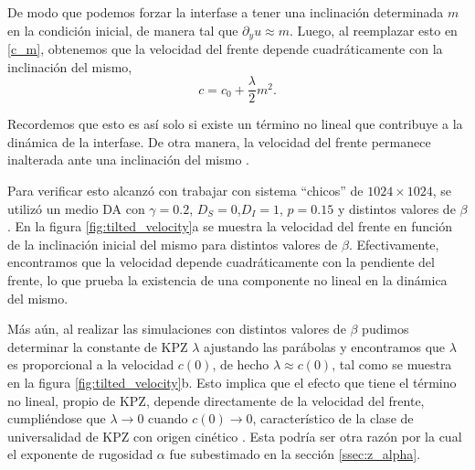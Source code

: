 De modo que podemos forzar la interfase a tener una inclinación determinada $m$ en la condición inicial, de manera tal que $\partial_y u \approx m$. Luego, al reemplazar esto en \ref{c_m}, obtenemos que la velocidad del frente depende cuadráticamente con la inclinación del mismo,
\begin{equation}
    c = c_0 + \frac{\lambda}{2} m^2.
\end{equation}

Recordemos que esto es así solo si existe un término no lineal que contribuye a la dinámica de la interfase. De otra manera, la velocidad del frente permanece inalterada ante una inclinación del mismo \cite{krug1990mechanism}.

Para verificar esto alcanzó con trabajar con sistema ``chicos'' de $1024\times1024$, se utilizó un medio DA con $\gamma = 0.2$, $D_S = 0$,$D_I=1$, $p=0.15$ y distintos valores de $\beta$. En la figura \ref{fig:tilted_velocity}a se muestra la velocidad del frente en función de la inclinación inicial del mismo para distintos valores de $\beta$. Efectivamente, encontramos que la velocidad depende cuadráticamente con la pendiente del frente, lo que prueba la existencia de una componente no lineal en la dinámica del mismo.

Más aún, al realizar las simulaciones con distintos valores de $\beta$ pudimos determinar la constante de KPZ $\lambda$ ajustando las parábolas y encontramos que $\lambda$ es proporcional a la velocidad $c(0)$, de hecho $\lambda \approx c(0)$, tal como se muestra en la figura \ref{fig:tilted_velocity}b. Esto implica que el efecto que tiene el término no lineal, propio de KPZ, depende directamente de la velocidad del frente, cumpliéndose que $\lambda\to0$ cuando $c(0)\to0$, característico de la clase de universalidad de KPZ con origen cinético \cite{barabasi}. Esta podría ser otra razón por la cual el exponente de rugosidad $\alpha$ fue subestimado en la sección \ref{ssec:z_alpha}.

